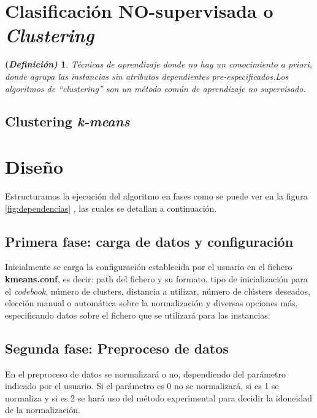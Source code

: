 \documentclass[10pt,a4paper]{article}
\newtheorem{defi}{(\it Definición)}[section]%
\begin{document}
\section{Clasificación \textbf{NO-supervisada} o \textit{Clustering}}

\begin{defi}
	Técnicas de aprendizaje donde no hay un conocimiento a priori, donde agrupa las instancias sin atributos dependientes pre-especificados.Los algoritmos de ``clustering'' son un método común de aprendizaje no supervisado.
	
\end{defi}

\subsection{Clustering \textit{\textbf{k-means}}}


\section{Diseño}
 
 Estructuramos la ejecución del algoritmo en fases como se puede ver en la figura \ref{fig:dependencias} , las cuales se detallan a continuación.\\
 
\subsection*{Primera fase: carga de datos y configuración}
 
 Inicialmente se carga la configuración
 establecida por el usuario en el fichero \textbf{kmeans.conf}, es decir: path
 del fichero y su formato, tipo de inicialización para el \textit{codebook}, número de clusters, distancia a
 utilizar, número de clústers deseados, elección manual o automática sobre la
 normalización y diversas opciones más, especificando datos sobre el fichero que
 se utilizará para las instancias.

\subsection*{Segunda fase: Preproceso de datos}

En el preproceso de datos se normalizará o no, dependiendo del parámetro
indicado por el usuario. Si el parámetro es 0 no se normalizará, si es 1 se
normaliza y si es 2 se hará uso del método experimental para decidir la
idoneidad de la normalización.
\end{document}

